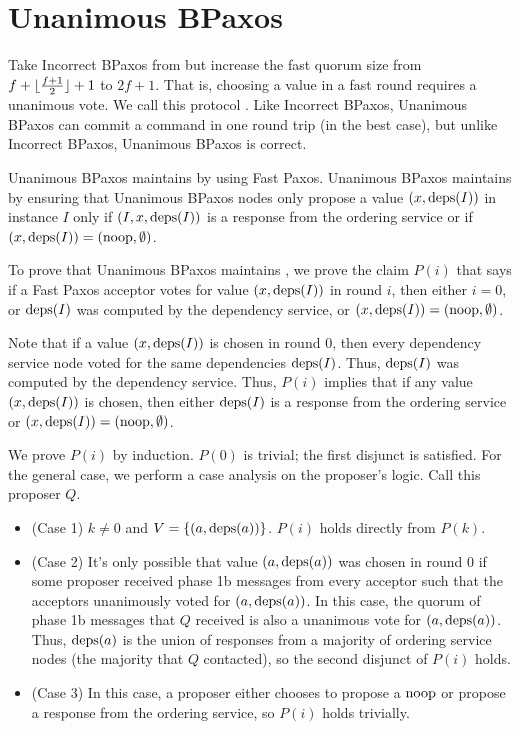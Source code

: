\section{Unanimous BPaxos}
Take Incorrect BPaxos from  but increase the fast
quorum size from $f + \lfloor\frac{f + 1}{2}\rfloor + 1$ to $2f + 1$. That is, choosing a value in a
fast round requires a unanimous vote. We call this protocol . Like Incorrect BPaxos, Unanimous BPaxos can commit a command in one
round trip (in the best case), but unlike Incorrect BPaxos, Unanimous BPaxos is
correct.

Unanimous BPaxos maintains  by using Fast Paxos.
Unanimous BPaxos maintains  by ensuring that
Unanimous BPaxos nodes only propose a value $(x, \text{deps}(I))$ in instance $I$
only if $(I, x, \text{deps}(I))$ is a response from the ordering service or if $(x,
\text{deps}(I)) = (\text{noop}, \emptyset)$.

\vspace{10in}


To
prove that Unanimous BPaxos maintains , we prove the
claim $P(i)$ that says if a Fast Paxos acceptor votes for value $(x, \text{deps}(I))$
in round $i$, then either
  $i = 0$, or
  $\text{deps}(I)$ was computed by the dependency service, or
  $(x, \text{deps}(I)) = (\text{noop}, \emptyset)$.

Note that if a value $(x, \text{deps}(I))$ is chosen in round $0$, then every
dependency service node voted for the same dependencies $\text{deps}(I)$. Thus,
$\text{deps}(I)$ was computed by the dependency service. Thus, $P(i)$ implies that
if any value $(x, \text{deps}(I))$ is chosen, then either $\text{deps}(I)$ is a response
from the ordering service or $(x, \text{deps}(I)) = (\text{noop}, \emptyset)$.

We prove $P(i)$ by induction. $P(0)$ is trivial; the first disjunct is
satisfied. For the general case, we perform a case analysis on the proposer's
logic. Call this proposer $Q$.
\begin{itemize}
  \item (Case 1)
    $k \neq 0$ and $V = \{(a, \text{deps}(a))\}$. $P(i)$ holds directly from
    $P(k)$.

  \item (Case 2)
    It's only possible that value $(a, \text{deps}(a))$ was chosen in round $0$ if
    some proposer received phase 1b messages from every acceptor such that the
    acceptors unanimously voted for $(a, \text{deps}(a))$.
    In this case, the quorum of phase 1b messages that $Q$ received is also a
    unanimous vote for $(a, \text{deps}(a))$.  Thus, $\text{deps}(a)$ is the union of
    responses from a majority of ordering service nodes (the majority that $Q$
    contacted), so the second disjunct of $P(i)$ holds.

  \item (Case 3)
    In this case, a proposer either chooses to propose a $\text{noop}$ or propose a
    response from the ordering service, so $P(i)$ holds trivially.
\end{itemize}

